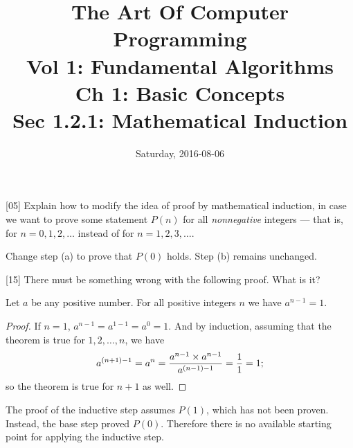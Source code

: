 \documentclass{amsart}
\title{The Art Of Computer Programming\\
  Vol 1: Fundamental Algorithms\\
  Ch 1: Basic Concepts\\
  Sec 1.2.1: Mathematical Induction}
\date{Saturday, 2016-08-06}
\begin{document}
\maketitle

\begin{problem}{[}05{]}
  Explain how to modify the idea of proof by mathematical induction, in case we
  want to prove some statement \(P(n)\) for all \emph{nonnegative} integers
  --- that is, for \(n = 0, 1, 2, \dots\) instead of for \(n=1,2,3,\dots\).
\end{problem}

\begin{solution}
  Change step (a) to prove that \(P(0)\) holds. Step (b) remains unchanged.
\end{solution}

\begin{problem}{[}15{]}
  There must be something wrong with the following proof.  What is it?

  \begin{theorem}
    Let \(a\) be any positive number.  For all positive integers \(n\) we have
    \(a ^{n - 1} = 1\).
  \end{theorem}
  \begin{proof}
    If \(n = 1\), \(a^{n-1}=a^{1-1}=a^0=1\). And by induction, assuming that the
    theorem is true for \(1, 2, \dots, n\), we have
    \begin{equation*}
      a^{(n+1)-1} = a^n = \frac{a^{n-1} \times a^{n-1}}{a^{(n-1)-1}} =
        \frac{1 \time 1}{1} = 1;
    \end{equation*}
    so the theorem is true for \(n+1\) as well.
  \end{proof}
\end{problem}

\begin{solution}
  The proof of the inductive step assumes \(P(1)\), which has not been proven.
  Instead, the base step proved \(P(0)\). Therefore there is no available
  starting point for applying the inductive step.
\end{solution}
\end{document}
